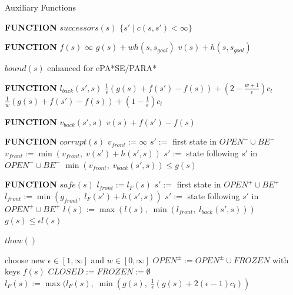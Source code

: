 \documentclass[letterpaper]{article}
\begin{document}
\begin{algorithm}
\caption{Auxiliary Functions}
\label{alg:aux}
\begin{algorithmic}
\STATE \textbf{FUNCTION} $successors(s)$
\RETURN $\{s' \mid c(s,s')<\infty\}$

\STATE \textbf{FUNCTION} $f(s)$
\RETURN $\infty$
\RETURN $g(s) + wh(s,s_{goal})$
\ELSE
\RETURN $v(s) + h(s,s_{goal})$
\ENDIF
\end{algorithmic}
\end{algorithm}

\begin{algorithm}
\caption{$bound(s)$ enhanced for ePA*SE/PARA*}
\label{alg:eaux}
\begin{algorithmic}
\STATE \textbf{FUNCTION} $l_{back}(s',s)$
\RETURN $\frac 1 \epsilon\left(g(s) + f(s') - f(s)\right) + (2-\frac{w+1}\epsilon)c_l$
\ELSE
\RETURN $\frac 1 w\left(g(s) + f(s') - f(s)\right) + (1-\frac 1\epsilon)c_l$
\ENDIF

\STATE \textbf{FUNCTION} $v_{back}(s',s)$
\RETURN $v(s) + f(s') - f(s)$

\STATE \textbf{FUNCTION} $corrupt(s)$
\STATE $v_{front} := \infty$
\STATE $s' :=$ first state in $OPEN^-\cup BE^-$
\STATE $v_{front} := \min(v_{front},\;v(s') + h(s',s))$
\STATE $s' :=$ state following $s'$ in $OPEN^-\cup BE^-$
\ENDWHILE
\RETURN $\min(v_{front},\;v_{back}(s',s)) \le g(s)$

\STATE \textbf{FUNCTION} $safe(s)$
\RETURN \FALSE
\ENDIF
\STATE $l_{front} := l_F(s)$
\STATE $s' :=$ first state in $OPEN^+ \cup BE^+$
\STATE $l_{front} := \min(g_{front},\;l_F(s') + h(s',s))$
\STATE $s' :=$ state following $s'$ in $OPEN^+ \cup BE^+$
\ENDWHILE
\STATE $l(s) := \max\left(l(s), \; \min(l_{front},\;l_{back}(s',s))\right)$
\RETURN $g(s) \le \epsilon l(s)$
\end{algorithmic}
\end{algorithm}

\begin{algorithm}
\caption{$thaw()$}
\label{alg:thaw}
\begin{algorithmic}
\STATE choose new $\epsilon \in [1,\infty]$ and $w \in [0,\infty]$
\STATE $OPEN^\pm := OPEN^\pm \cup FROZEN$ with keys $f(s)$
\STATE $CLOSED := FROZEN := \emptyset$
\STATE $l_F(s) := \max(l_F(s),\; \min(g(s),\; \frac 1\epsilon (g(s) + 2(\epsilon-1)c_l))$
\ENDFOR
\end{algorithmic}
\end{algorithm}
\end{document}
